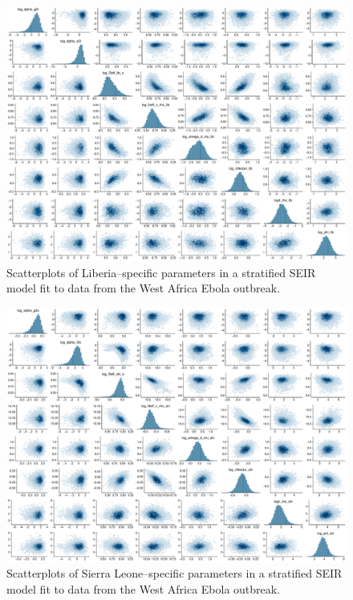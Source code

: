 \begin{figure}[htbp]
	\centering
	\includegraphics[width=\linewidth]{figures/ebola_joint_pairs_lib}
	\caption{Scatterplots of Liberia--specific parameters in a stratified SEIR model fit to data from the West Africa Ebola outbreak.}
	\label{fig:ebola_joint_pairs_lib}
\end{figure}

\begin{figure}[htbp]
	\centering
	\includegraphics[width=\linewidth]{figures/ebola_joint_pairs_sln}
	\caption{Scatterplots of Sierra Leone--specific parameters in a stratified SEIR model fit to data from the West Africa Ebola outbreak.}
	\label{fig:ebola_joint_pairs_sln}
\end{figure}

